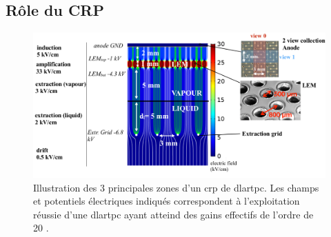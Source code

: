         \subsection{Rôle du CRP}\label{sec::crp_intro}
            \begin{figure}[htbp]
                \begin{center}\includegraphics[width=\textwidth,keepaspectratio]{Chapitre_3/pictures/crp_fields.png}\end{center}
                \caption[Champs électriques d'un  \gls{crp}.]{Illustration des 3 principales zones d'un \gls{crp} de \gls{dlartpc}. Les champs et potentiels électriques indiqués correspondent à l'exploitation réussie d'une \gls{dlartpc} ayant atteind des gains effectifs de l'ordre de 20 \cite{311paper2018,cantini3L}.}
                \label{fig::crp_fields}
            \end{figure}

